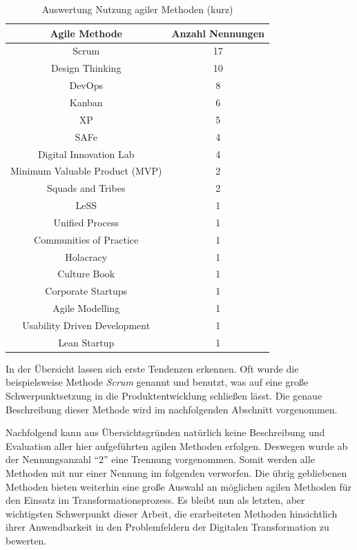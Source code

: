 \begin{table}[ht]
	\centering
	\caption{Auswertung Nutzung agiler Methoden (kurz)}
	\begin{tabular}{|c|c|}
		\hline
		\textbf{Agile Methode}& \textbf{Anzahl Nennungen} \\
		\hline
		Scrum                          & 17               \\
		Design Thinking                & 10               \\
		DevOps                         & 8                \\
		Kanban                         & 6                \\
		XP                             & 5                \\
		SAFe                           & 4                \\
		Digital Innovation Lab         & 4                \\
		Minimum Valuable Product (MVP) & 2                \\
		Squads and Tribes              & 2                \\
		LeSS                           & 1                \\
		Unified Process                & 1                \\
		Communities of Practice        & 1                \\
		Holacracy                      & 1                \\
		Culture Book                   & 1                \\
		Corporate Startups             & 1                \\
		Agile Modelling                & 1                \\
		Usability Driven Development   & 1                \\
		Lean Startup                   & 1               \\
		\hline
	\end{tabular}
	\label{tab:clusteringagileshort}
\end{table}

In der Übersicht lassen sich erste Tendenzen erkennen. Oft wurde die beispielsweise Methode \textit{Scrum} genannt und benutzt, was auf eine große Schwerpunktsetzung in die Produktentwicklung schließen lässt. Die genaue Beschreibung dieser Methode wird im nachfolgenden Abschnitt vorgenommen. 

Nachfolgend kann aus Übersichtsgründen natürlich keine Beschreibung und Evaluation aller hier aufgeführten agilen Methoden erfolgen. Deswegen wurde ab der  Nennungsanzahl ``2'' eine Trennung vorgenommen. Somit werden alle Methoden mit nur einer Nennung im folgenden verworfen. Die übrig gebliebenen Methoden bieten weiterhin eine große Auswahl an möglichen agilen Methoden für den Einsatz im Transformationsprozess. Es bleibt nun als letzten, aber wichtigsten Schwerpunkt dieser Arbeit, die erarbeiteten Methoden hinsichtlich ihrer Anwendbarkeit in den Problemfeldern der Digitalen Transformation zu bewerten.

